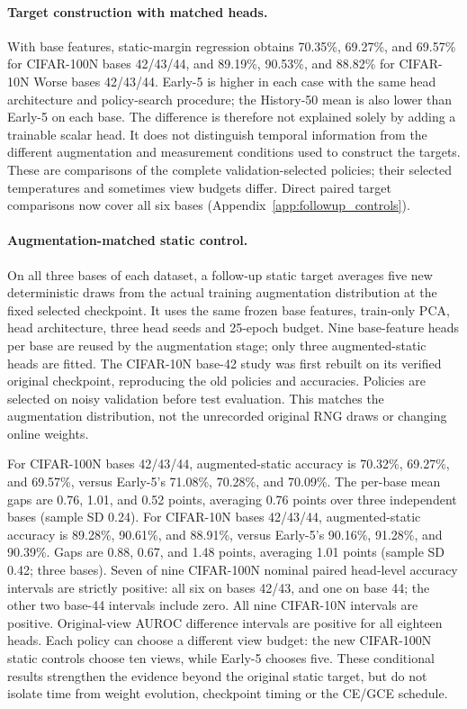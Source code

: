 \paragraph{Target construction with matched heads.}
With base features, static-margin regression obtains 70.35\%, 69.27\%, and 69.57\% for CIFAR-100N bases 42/43/44, and 89.19\%, 90.53\%, and 88.82\% for CIFAR-10N Worse bases 42/43/44. Early-5 is higher in each case with the same head architecture and policy-search procedure; the History-50 mean is also lower than Early-5 on each base. The difference is therefore not explained solely by adding a trainable scalar head. It does not distinguish temporal information from the different augmentation and measurement conditions used to construct the targets. These are comparisons of the complete validation-selected policies; their selected temperatures and sometimes view budgets differ. Direct paired target comparisons now cover all six bases (Appendix~\ref{app:followup_controls}).

\paragraph{Augmentation-matched static control.}
On all three bases of each dataset, a follow-up static target averages five new deterministic draws from the actual training augmentation distribution at the fixed selected checkpoint. It uses the same frozen base features, train-only PCA, head architecture, three head seeds and 25-epoch budget. Nine base-feature heads per base are reused by the augmentation stage; only three augmented-static heads are fitted. The CIFAR-10N base-42 study was first rebuilt on its verified original checkpoint, reproducing the old policies and accuracies. Policies are selected on noisy validation before test evaluation. This matches the augmentation distribution, not the unrecorded original RNG draws or changing online weights.

For CIFAR-100N bases 42/43/44, augmented-static accuracy is 70.32\%, 69.27\%, and 69.57\%, versus Early-5's 71.08\%, 70.28\%, and 70.09\%. The per-base mean gaps are 0.76, 1.01, and 0.52 points, averaging 0.76 points over three independent bases (sample SD 0.24). For CIFAR-10N bases 42/43/44, augmented-static accuracy is 89.28\%, 90.61\%, and 88.91\%, versus Early-5's 90.16\%, 91.28\%, and 90.39\%. Gaps are 0.88, 0.67, and 1.48 points, averaging 1.01 points (sample SD 0.42; three bases). Seven of nine CIFAR-100N nominal paired head-level accuracy intervals are strictly positive: all six on bases 42/43, and one on base 44; the other two base-44 intervals include zero. All nine CIFAR-10N intervals are positive. Original-view AUROC difference intervals are positive for all eighteen heads. Each policy can choose a different view budget: the new CIFAR-100N static controls choose ten views, while Early-5 chooses five. These conditional results strengthen the evidence beyond the original static target, but do not isolate time from weight evolution, checkpoint timing or the CE/GCE schedule.

